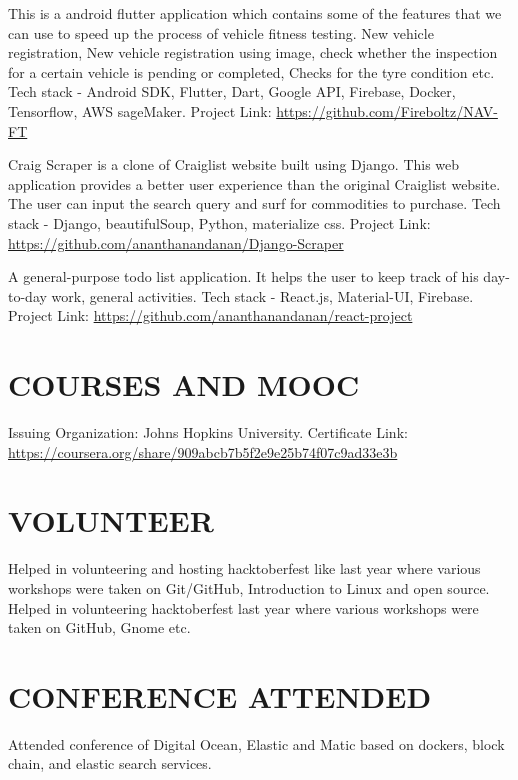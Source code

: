 \documentclass[11pt,a4paper,sans]{moderncv}        %
\begin{document}
{This is a android flutter application which contains some of the features that we can use to speed up the process of vehicle fitness testing. New vehicle registration, New vehicle registration using image, check whether the inspection for a certain vehicle is pending or completed, Checks for the tyre condition etc. Tech stack - Android SDK, Flutter, Dart, Google API, Firebase, Docker, Tensorflow, AWS sageMaker. Project Link: {\newline}
\url{https://github.com/Fireboltz/NAV-FT}}{}

{Craig Scraper is a clone of Craiglist website built using Django. This web application provides a better user experience than the original Craiglist website. The user can input the search query and surf for commodities to purchase.  Tech stack - Django, beautifulSoup, Python, materialize css. Project Link: {\newline}
\url{https://github.com/ananthanandanan/Django-Scraper}}{}

{A general-purpose todo list application. It helps the user to keep track of his day-to-day work, general activities. Tech stack - React.js, Material-UI, Firebase. Project Link: {\newline}
\url{https://github.com/ananthanandanan/react-project}}{}


\section{COURSES AND MOOC}
{Issuing Organization: Johns Hopkins University.{\newline}
Certificate Link:
\url{https://coursera.org/share/909abcb7b5f2e9e25b74f07c9ad33e3b}}{}




\section{VOLUNTEER}
{Helped in volunteering and hosting hacktoberfest like last year where various workshops were taken on Git/GitHub, Introduction to Linux and open source.}
{Helped in volunteering  hacktoberfest last year where various workshops were taken on GitHub, Gnome etc. }


\section{CONFERENCE ATTENDED}
{Attended conference of Digital Ocean, Elastic and Matic based on dockers, block chain, and elastic search services. }
\end{document}
